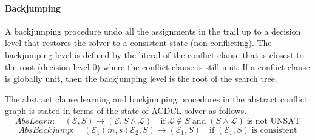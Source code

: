 \paragraph {\textbf{Backjumping}}
A backjumping procedure undo all the assignments in the trail up to 
a decision level that restores the solver to a consistent state 
(non-conflicting).  The backjumping level is defined by the literal 
of the conflict clause that is closest to the root (decision level 0) 
where the conflict clause is still unit. If a conflict clause is 
globally unit, then the backjumping level is the root of the search tree.

The abstract clause learning and backjumping procedures in the abstract 
conflict graph is stated in terms of the state of ACDCL solver as follows. 
\[AbsLearn: \quad  (\mathcal{E},S) \rightarrow (\mathcal{E},S \wedge
\mathcal{L}) \quad \text{if} \; \mathcal{L} \notin S \; \textrm{and}
\; (S \wedge \mathcal{L}) \; \text{is not UNSAT} \]
\[AbsBackjump: \quad (\mathcal{E}_1(m,s)\mathcal{E}_2,S) \rightarrow
(\mathcal{E}_1,S) \quad \text{if} \; (\mathcal{E}_1,S) \; \text{is
consistent} \]   


